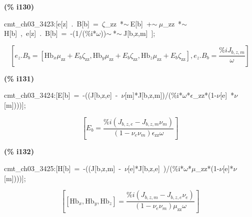 \documentclass[fleqn]{article}
\begin{document}
\noindent
\begin{minipage}[t]{4.000000em}\color{red}\bfseries
(\% i130)	
\end{minipage}
\begin{minipage}[t]{\textwidth}\color{blue}
cmt\_ch03\_3423:[e[z]\ .\ B[b]\ =\ \ensuremath{\zeta}\_zz\ *\ensuremath{\sim\ }E[b]\ +\ensuremath{\sim\ }\ensuremath{\mu}\_zz\ *\ensuremath{\sim\ }H[b]\ ,\ e[z]\ .\ B[b]\ =\ -(1/(\%i*\ensuremath{\omega}))\ensuremath{\sim\ }*\ensuremath{\sim\ }J[b,z,m]\ ];
\end{minipage}
\[\displaystyle \tag{cmt\_ ch03\_ 3423} 
\left[ {e_z}\ensuremath{\mathrm{ . }}{B_b}=\left[ {{\ensuremath{\mathrm{Hb}}}_x} {{\mu }_{\ensuremath{\mathrm{zz}}}}+{E_b} {{\zeta }_{\ensuremath{\mathrm{zz}}}}\operatorname{,}{{\ensuremath{\mathrm{Hb}}}_y} {{\mu }_{\ensuremath{\mathrm{zz}}}}+{E_b} {{\zeta }_{\ensuremath{\mathrm{zz}}}}\operatorname{,}{{\ensuremath{\mathrm{Hb}}}_z} {{\mu }_{\ensuremath{\mathrm{zz}}}}+{E_b} {{\zeta }_{\ensuremath{\mathrm{zz}}}}\right] \operatorname{,}{e_z}\ensuremath{\mathrm{ . }}{B_b}=\frac{\% i {J_{b,z,m}}}{\omega }\right] \mbox{}
\]


\noindent
\begin{minipage}[t]{4.000000em}\color{red}\bfseries
(\% i131)	
\end{minipage}
\begin{minipage}[t]{\textwidth}\color{blue}
cmt\_ch03\_3424:[E[b]\ =\ -((J[b,z,e]\ -\ \ensuremath{\nu}[m]*J[b,z,m])/(\%i*\ensuremath{\omega}*\ensuremath{\epsilon}\_zz*(1-\ensuremath{\nu}[e]\ *\ensuremath{\nu}[m])))];
\end{minipage}
\[\displaystyle \tag{cmt\_ ch03\_ 3424} 
\left[ {E_b}=\frac{\% i \left( {J_{b,z,e}}-{J_{b,z,m}} {{\nu }_m}\right) }{\left( 1-{{\nu }_e} {{\nu }_m}\right)  {{\epsilon }_{\ensuremath{\mathrm{zz}}}} \omega }\right] \mbox{}
\]


\noindent
\begin{minipage}[t]{4.000000em}\color{red}\bfseries
(\% i132)	
\end{minipage}
\begin{minipage}[t]{\textwidth}\color{blue}
cmt\_ch03\_3425:[H[b]\ =\ -((J[b,z,m]\ -\ \ensuremath{\nu}[e]*J[b,z,e]\ )/(\%i*\ensuremath{\omega}*\ensuremath{\mu}\_zz*(1-\ensuremath{\nu}[e]*\ensuremath{\nu}[m])))];
\end{minipage}
\[\displaystyle \tag{cmt\_ ch03\_ 3425} 
\left[ \left[ {{\ensuremath{\mathrm{Hb}}}_x}\operatorname{,}{{\ensuremath{\mathrm{Hb}}}_y}\operatorname{,}{{\ensuremath{\mathrm{Hb}}}_z}\right] =\frac{\% i \left( {J_{b,z,m}}-{J_{b,z,e}} {{\nu }_e}\right) }{\left( 1-{{\nu }_e} {{\nu }_m}\right)  {{\mu }_{\ensuremath{\mathrm{zz}}}} \omega }\right] \mbox{}
\]
\end{document}
